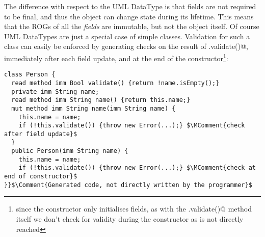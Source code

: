 The difference with respect to the UML DataType is that fields are not required to be final, and thus the object can change state during its lifetime. This means that the ROGs of all the \emph{fields} are immutable, but not the object itself.
Of course UML DataTypes are just a special case of simple classes.
Validation for such a class can easily be enforced by generating checks on the result of \Q@.validate()@, immediately after each field update, and at the end of the constructor\footnote{since the constructor only initialises fields, as with the \Q@.validate()@ method itself we don't check for validity during the constructor as \Q@this@ is not directly reached}:
\begin{lstlisting}
class Person {
  read method imm Bool validate() {return !name.isEmpty();}
  private imm String name;
  read method imm String name() {return this.name;}
  mut method imm String name(imm String name) {
    this.name = name;
    if (!this.validate()) {throw new Error(...);} $\MComment{check after field update}$
  }
  public Person(imm String name) {
    this.name = name;
    if (!this.validate()) {throw new Error(...);} $\MComment{check at end of constructor}$
}}$\Comment{Generated code, not directly written by the programmer}$
\end{lstlisting}


